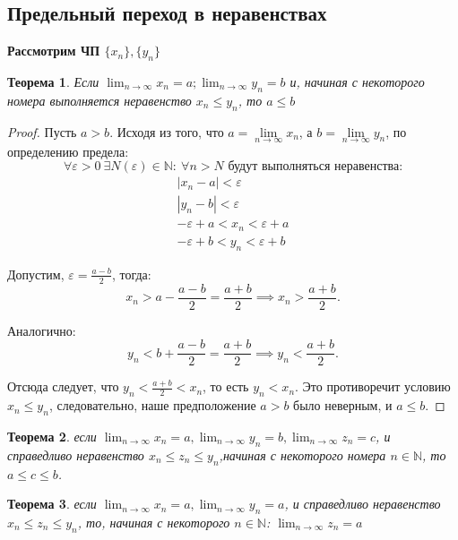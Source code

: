 \documentclass[12pt, a4paper]{article}
\newtheorem{theorem}{Теорема}[subsection]
\theoremstyle{remark}
\newcommand{\N}{\mathbb{N}}
\begin{document}
	\subsection{Предельный переход в неравенствах}
	
	\textbf{Рассмотрим ЧП $\{x_n\}, \{y_n\}$}
	
	\begin{theorem}
		Если $\lim_{n \to \infty} x_n = a; \lim_{n \to \infty} y_n = b$ и, начиная с некоторого номера выполняется неравенство $x_n \leq y_n$, то $a \leq b$
	\end{theorem}
	
	\begin{proof}
		Пусть \(a > b\). Исходя из того, что \(a = \lim\limits_{n \to \infty} x_n\), а \(b = \lim\limits_{n \to \infty} y_n\), по определению предела:
		\[
		\forall \varepsilon > 0 \ \exists N(\varepsilon) \in \mathbb{N}: \ \forall n > N \text{ будут выполняться неравенства:}
		\]
		\begin{gather*}
			|x_n - a| < \varepsilon \\
			|y_n - b| < \varepsilon \\
			-\varepsilon + a < x_n < \varepsilon + a \\
			-\varepsilon + b < y_n < \varepsilon + b
		\end{gather*}
		
		Допустим, \(\varepsilon = \frac{a-b}{2}\), тогда:
		\[
		x_n > a - \frac{a - b}{2} = \frac{a + b}{2} \implies x_n > \frac{a + b}{2}.
		\]
		
		Аналогично:
		\[
		y_n < b + \frac{a - b}{2} = \frac{a + b}{2} \implies y_n < \frac{a + b}{2}.
		\]
		
		Отсюда следует, что \(y_n < \frac{a + b}{2} < x_n\), то есть \(y_n < x_n\). Это противоречит условию \(x_n \leq y_n\), следовательно, наше предположение \(a > b\) было неверным, и \(a \leq b\).
	\end{proof}
	
	\begin{theorem}
		если $\lim_{n \to \infty} x_n = a, \lim_{n \to \infty} y_n = b, \lim_{n \to \infty} z_n = c$, и справедливо неравенство $x_n \leq z_n \leq y_n$,начиная с некоторого номера $n \in \N$, то $a \leq c \leq b$.
	\end{theorem}
	
	\begin{theorem}
		если $\lim_{n \to \infty} x_n = a, \lim_{n \to \infty} y_n = a$, и справедливо неравенство $x_n \leq z_n \leq y_n$, то, начиная с некоторого $n \in \N$: $\lim_{n \to \infty} z_n = a$
	\end{theorem}
	
\end{document}

